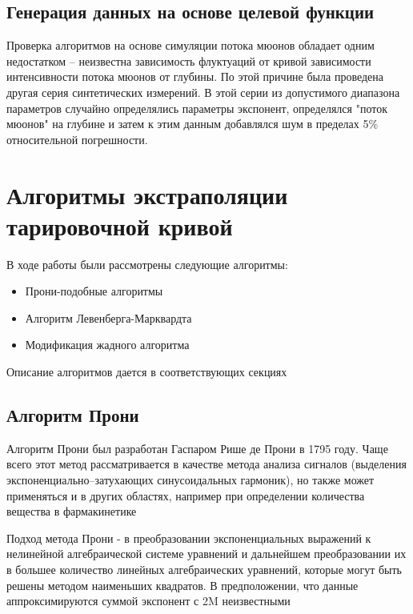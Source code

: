 \subsection{Генерация данных на основе целевой функции}\label{subsect2_3_2}


Проверка алгоритмов на основе симуляции потока мюонов обладает 
одним недостатком -- неизвестна зависимость флуктуаций от  
кривой зависимости интенсивности 
потока мюонов от глубины. По этой причине была проведена другая серия 
синтетических измерений. В этой серии из допустимого диапазона 
параметров случайно определялись параметры 
экспонент, определялся "поток мюонов" на глубине и затем к этим 
данным добавлялся шум в пределах 5\% относительной погрешности.



\section{Алгоритмы экстраполяции тарировочной кривой}\label{sect2_4}

В ходе работы были рассмотрены следующие алгоритмы:

\begin{itemize}
 \item Прони-подобные алгоритмы
 \item Алгоритм Левенберга-Марквардта
 \item Модификация жадного алгоритма
 
\end{itemize}

Описание алгоритмов дается в соответствующих секциях

\subsection{Алгоритм Прони}\label{subsect2_4_1}

Алгоритм Прони был разработан Гаспаром Рише де Прони в 1795 году. Чаще всего этот метод рассматривается в 
качестве метода анализа сигналов (выделения экспоненциально--затухающих
синусоидальных гармоник), но также может применяться и в других областях, например при определении количества 
вещества в фармакинетике \cite{pharmakinetics}

Подход метода Прони - в преобразовании экспоненциальных выражений к нелинейной алгебраической системе уравнений и 
дальнейшем преобразовании их в большее количество линейных алгебраических уравнений, которые могут быть решены 
методом наименьших квадратов. В предположении, что данные аппроксимируются суммой экспонент с 2M неизвестными

